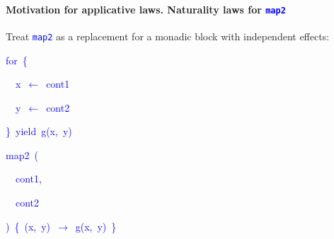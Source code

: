 \paragraph{Motivation for applicative laws. Naturality laws for \texttt{\textcolor{blue}{\footnotesize{}map2}} }

Treat \texttt{\textcolor{blue}{\footnotesize{}map2}} as a replacement
for a monadic block with independent effects:\texttt{\textcolor{blue}{\footnotesize{}\smallskip{}
}}{\footnotesize\par}

\texttt{\textcolor{blue}{\footnotesize{}}}%
\begin{minipage}[c][1\totalheight][t]{0.49\columnwidth}%
\begin{lyxcode}
\textcolor{blue}{\footnotesize{}for~\{}{\footnotesize\par}

\textcolor{blue}{\footnotesize{}~~x~$\leftarrow$~cont1}{\footnotesize\par}

\textcolor{blue}{\footnotesize{}~~y~$\leftarrow$~cont2}{\footnotesize\par}

\textcolor{blue}{\footnotesize{}\}~yield~g(x,~y)}{\footnotesize\par}
\end{lyxcode}
%
\end{minipage}\texttt{\textcolor{blue}{\footnotesize{}\hfill{}}}%
\begin{minipage}[c][1\totalheight][t]{0.49\columnwidth}%
\begin{lyxcode}
\textcolor{blue}{\footnotesize{}map2~(}{\footnotesize\par}

\textcolor{blue}{\footnotesize{}~~cont1,}{\footnotesize\par}

\textcolor{blue}{\footnotesize{}~~cont2}{\footnotesize\par}

\textcolor{blue}{\footnotesize{})~\{~(x,~y)~$\rightarrow$~g(x,~y)~\}}{\footnotesize\par}
\end{lyxcode}
%
\end{minipage}\texttt{\textcolor{blue}{\footnotesize{}\hfill{}\medskip{}
}}{\footnotesize\par}
